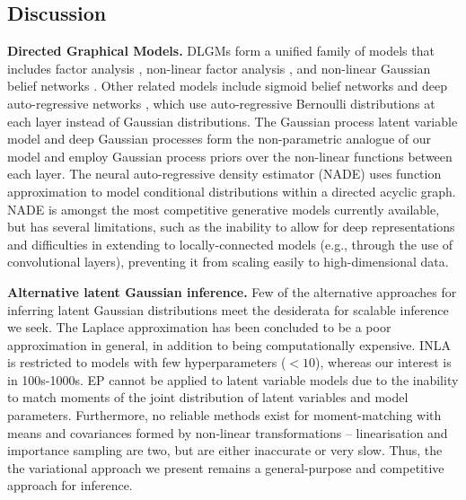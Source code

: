 \documentclass{article}
\begin{document}
\begin{bibunit}[icml2013]
\section{Discussion}
\label{sec:discussion}
\label{sec:relatedWork}
\textbf{Directed Graphical Models.} 
DLGMs form a unified family of models that includes factor analysis \citep{book:bartholomew}, non-linear factor analysis \citep{lappalainen2000bayesian}, and non-linear Gaussian belief networks \citep{frey1999a}.
Other related models include
sigmoid belief networks \citep{saul1996mean} and
deep 
auto-regressive networks \citep{gregor2013}, which use 
auto-regressive 
Bernoulli distributions at each 
layer instead of Gaussian distributions. The Gaussian process latent 
variable model and deep Gaussian processes
\citep{lawrence2005probabilistic, damianou2013} form the non-parametric analogue of 
our model and employ Gaussian process priors over the non-linear functions 
between each layer. 
The neural auto-regressive density estimator (NADE) \citep{larochelle2011, uria2013} 
uses function approximation to model conditional distributions within a 
directed acyclic graph. 
NADE is amongst the most competitive generative models currently available, 
but has several limitations,
such as the inability to allow for deep representations and difficulties in 
extending to locally-connected models (e.g., through the use of 
convolutional layers),  preventing it from scaling easily to 
high-dimensional data.

\textbf{Alternative latent Gaussian inference.} Few of the alternative approaches for inferring latent Gaussian distributions meet the desiderata for scalable inference we seek. 
The Laplace approximation has been concluded to be a poor approximation in general, in addition to being computationally expensive.
INLA is restricted to models with few hyperparameters ($<10$), whereas our interest is in 100s-1000s.
EP cannot be applied to latent variable models due to the inability to match moments of the joint distribution of latent variables and model parameters. %
Furthermore, no reliable methods exist for moment-matching with means and covariances formed by non-linear transformations -- linearisation and importance sampling are two, but are either inaccurate or very slow. Thus, the the variational approach we present remains a general-purpose and competitive approach for inference.


\end{bibunit}
\end{document}
